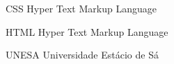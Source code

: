 
\begin{siglas}
  \item[CSS] Hyper Text Markup Language
  \item[HTML] Hyper Text Markup Language
  \item[UNESA] Universidade Estácio de Sá
\end{siglas}
